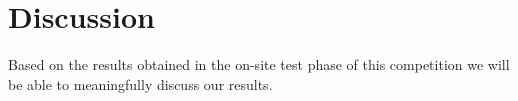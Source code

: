 \section{Discussion}
Based on the results obtained in the on-site test phase of this competition we will be able to meaningfully discuss our results.